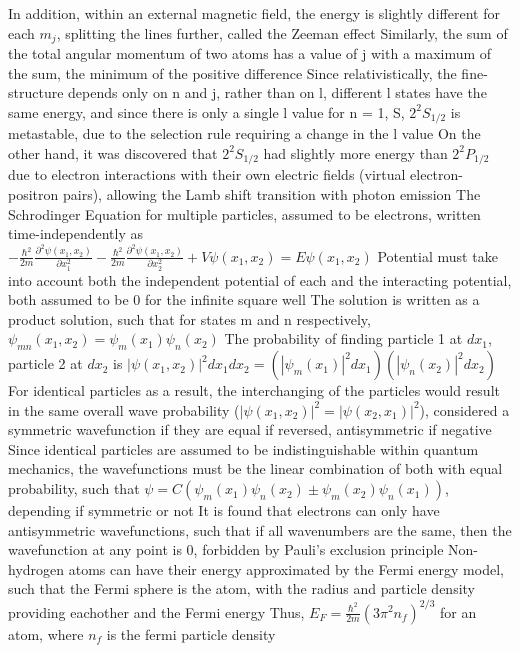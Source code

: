 \documentclass[11 pt, twoside]{article}
\newenvironment{outline*}
{
	\begin{outline}[enumerate]
	}
	{\end{outline}
}
\begin{document}
\begin{outline*}
		\3 In addition, within an external magnetic field, the energy is slightly different for each $m_j$, splitting the lines further, called the Zeeman effect
	\2 Similarly, the sum of the total angular momentum of two atoms has a value of j with a maximum of the sum, the minimum of the positive difference
	\2 Since relativistically, the fine-structure depends only on n and j, rather than on l, different l states have the same energy, and since there is only a single l value for n = 1, S, $2^2S_{1/2}$ is metastable, due to the selection rule requiring a change in the l value
		\3 On the other hand, it was discovered that $2^2S_{1/2}$ had slightly more energy than $2^2P_{1/2}$ due to electron interactions with their own electric fields (virtual electron-positron pairs), allowing the Lamb shift transition with photon emission
\1 The Schrodinger Equation for multiple particles, assumed to be electrons, written time-independently as $-\frac{\hbar^2}{2m}\frac{\partial^2\psi(x_1, x_2)}{\partial x_1^2} -\frac{\hbar^2}{2m}\frac{\partial^2\psi(x_1, x_2)}{\partial x_2^2} + V\psi(x_1, x_2) = E\psi(x_1, x_2)$
	\2 Potential must take into account both the independent potential of each and the interacting potential, both assumed to be 0 for the infinite square well
	\2 The solution is written as a product solution, such that for states m and n respectively, $\psi_{mn}(x_1, x_2) = \psi_m(x_1)\psi_n(x_2)$
		\3 The probability of finding particle 1 at $dx_1$, particle 2 at $dx_2$ is $|\psi(x_1, x_2)|^2dx_1dx_2 = (|\psi_m(x_1)|^2dx_1)(|\psi_n(x_2)|^2dx_2)$
		\3 For identical particles as a result, the interchanging of the particles would result in the same overall wave probability ($|\psi(x_1, x_2)|^2 = |\psi(x_2, x_1)|^2$), considered a symmetric wavefunction if they are equal if reversed, antisymmetric if negative
	\2 Since identical particles are assumed to be indistinguishable within quantum mechanics, the wavefunctions must be the linear combination of both with equal probability, such that $\psi = C(\psi_m(x_1)\psi_n(x_2) \pm \psi_m(x_2)\psi_n(x_1))$, depending if symmetric or not
	\2 It is found that electrons can only have antisymmetric wavefunctions, such that if all wavenumbers are the same, then the wavefunction at any point is 0, forbidden by Pauli's exclusion principle
\1 Non-hydrogen atoms can have their energy approximated by the Fermi energy model, such that the Fermi sphere is the atom, with the radius and particle density providing eachother and the Fermi energy
	\2 Thus, $E_F = \frac{\hbar^2}{2m}(3\pi^2n_f)^{2/3}$ for an atom, where $n_f$ is the fermi particle density

\end{outline*}
\end{document}
